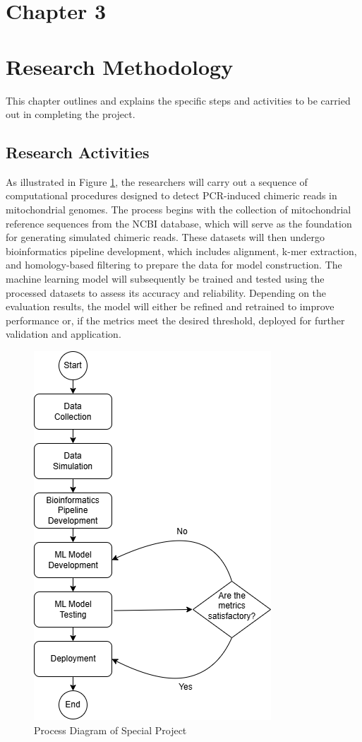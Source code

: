 \section*{Chapter 3}\label{sec:researchmethod}
\section{Research Methodology}
This chapter outlines and explains the specific steps and activities to be carried out in completing the project.

 \subsection{Research Activities}
 As illustrated in Figure \ref{fig:process_diagram}, the researchers will carry out a sequence of computational procedures designed to detect PCR-induced chimeric reads in mitochondrial genomes. The process begins with the collection of mitochondrial reference sequences from the NCBI database, which will serve as the foundation for generating simulated chimeric reads. These datasets will then undergo bioinformatics pipeline development, which includes alignment, k-mer extraction, and homology-based filtering to prepare the data for model construction. The machine learning model will subsequently be trained and tested using the processed datasets to assess its accuracy and reliability. Depending on the evaluation results, the model will either be refined and retrained to improve performance or, if the metrics meet the desired threshold, deployed for further validation and application.

\begin{figure}[H]
    \centering
    \includegraphics[width=0.4\linewidth]{figures/research_activities.png}
    \caption{Process Diagram of Special Project}
    \label{fig:process_diagram}  %
\end{figure}

